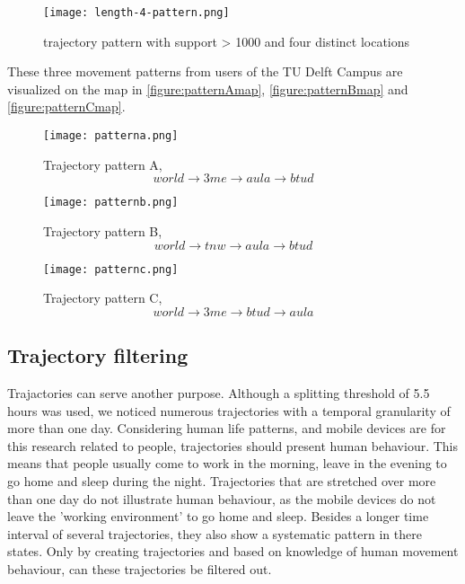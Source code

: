 \begin{figure}[H]
\centering
\texttt{[image: length-4-pattern.png]}
\captionsetup{justification=centering}
\caption{trajectory pattern with support > 1000 and four distinct locations}
\label{figure:len4pattern}
\end{figure}

These three movement patterns from users of the TU Delft Campus are visualized on the map in \autoref{figure:patternAmap}, \autoref{figure:patternBmap} and \autoref{figure:patternCmap}.

\begin{figure}[H]
\centering
\texttt{[image: patterna.png]}
\captionsetup{justification=centering}
\caption{Trajectory pattern A, $$world\rightarrow 3me \rightarrow aula \rightarrow btud$$}
\label{figure:patternAmap}
\end{figure}

\begin{figure}[H]
\centering
\texttt{[image: patternb.png]}
\captionsetup{justification=centering}
\caption{Trajectory pattern B, $$world\rightarrow tnw \rightarrow aula \rightarrow btud$$}
\label{figure:patternBmap}
\end{figure}

\begin{figure}[H]
\centering
\texttt{[image: patternc.png]}
\captionsetup{justification=centering}
\caption{Trajectory pattern C, $$world\rightarrow 3me \rightarrow btud \rightarrow aula$$}
\label{figure:patternCmap}
\end{figure}

\subsection{Trajectory filtering}
Trajactories can serve another purpose. Although a splitting threshold of 5.5 hours was used, we noticed numerous trajectories with a temporal granularity of more than one day. Considering human life patterns, and mobile devices are for this research related to people, trajectories should present human behaviour. This means that people usually come to work in the morning, leave in the evening to go home and sleep during the night. Trajectories that are stretched over more than one day do not illustrate human behaviour, as the mobile devices do not leave the 'working environment' to go home and sleep. Besides a longer time interval of several trajectories, they also show a systematic pattern in there states. Only by creating trajectories and based on knowledge of human movement behaviour, can these trajectories be filtered out. 
